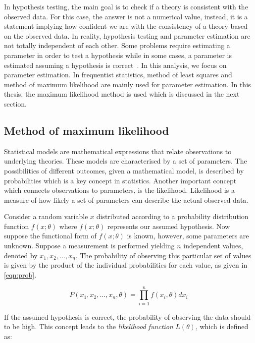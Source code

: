 In hypothesis testing, the main goal is to check if a theory is consistent with the observed data.
For this case, the answer is not a numerical value, instead, it is a statement implying 
how confident we are with the consistency of a theory based on the observed data. In reality,
hypothesis testing and parameter estimation are not totally independent of each other. 
Some problems require estimating a parameter in order to test a hypothesis while in some cases, 
a parameter is estimated assuming a hypothesis is correct~\cite{Lyons_1986}. In this analysis,
we focus on parameter estimation. In frequentist statistics, method of least squares and 
method of maximum likelihood are mainly used for parameter estimation. In this thesis, the maximum likelihood 
method is used which is discussed in the next section. 

\subsection*{Method of maximum likelihood}

Statistical models are mathematical expressions that relate observations to underlying theories.
These models are characterised by a set of parameters. The possibilities of different outcomes, 
given a mathematical model, is described by probabilities which is a key concept in statistics.
Another important concept which connects observations to parameters, is the likelihood.
Likelihood is a measure of how likely a set of parameters can describe the actual observed data. 

Consider a random variable $x$ distributed according to a probability distribution function $f(x;\theta)$
where $f(x;\theta)$ represents our assumed hypothesis. Now suppose the functional form of $f(x;\theta)$ 
is known, however, some parameters are unknown. Suppose a measurement is performed yielding $n$ independent
values, denoted by ${x_1,x_2,...,x_n}$.  The probability of observing this particular set of values 
is given by the product of the individual probabilities for each value, as given in \cref{eqn:prob}. 

\begin{equation}
    P (x_1,x_2,...,x_n,\theta) = \prod_{i=1}^{n} f (x_i,\theta)dx_i
    \label{eqn:prob}
\end{equation}

If the assumed hypothesis is correct, the probability of observing the data should to be high. 
This concept leads to the \textit{likelihood function} $L(\theta)$, which is defined as:

